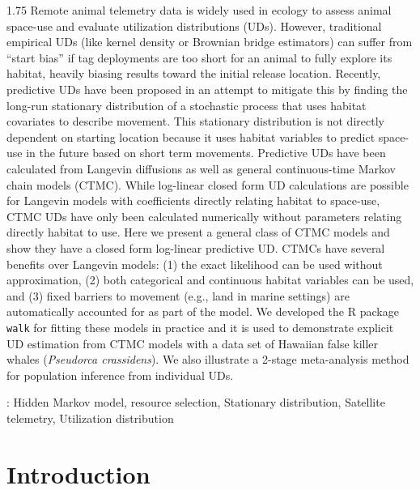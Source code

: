 \documentclass[12pt]{article}
\begin{document}
\begin{spacing}{1.75}
Remote animal telemetry data is widely used in ecology to assess animal space-use and evaluate utilization distributions (UDs). However, traditional empirical UDs (like kernel density or Brownian bridge estimators) can suffer from ``start bias'' if tag deployments are too short for an animal to fully explore its habitat, heavily biasing results toward the initial release location. Recently, predictive UDs have been proposed in an attempt to mitigate this by finding the long-run stationary distribution of a stochastic process that uses habitat covariates to describe movement. This stationary distribution is not directly dependent on starting location because it uses habitat variables to predict space-use in the future based on short term movements. Predictive UDs have been calculated from Langevin diffusions as well as general continuous-time Markov chain models (CTMC). While log-linear closed form UD calculations are possible for Langevin models with coefficients directly relating habitat to space-use, CTMC UDs have only been calculated numerically without parameters relating directly habitat to use. Here we present a general class of CTMC models and show they have a closed form log-linear predictive UD. CTMCs have several benefits over Langevin models: (1) the exact likelihood can be used without approximation, (2) both categorical and continuous habitat variables can be used, and (3) fixed barriers to movement (e.g., land in marine settings) are automatically accounted for as part of the model. We developed the R package {\tt walk} for fitting these models in practice and it is used to demonstrate explicit UD estimation from CTMC models with a data set of Hawaiian false killer whales (\emph{Pseudorca crassidens}). We also illustrate a 2-stage meta-analysis method for population inference from individual UDs.  

: Hidden Markov model, resource selection, Stationary distribution, Satellite telemetry, Utilization distribution


\section{Introduction}


\end{spacing}
\end{document}
